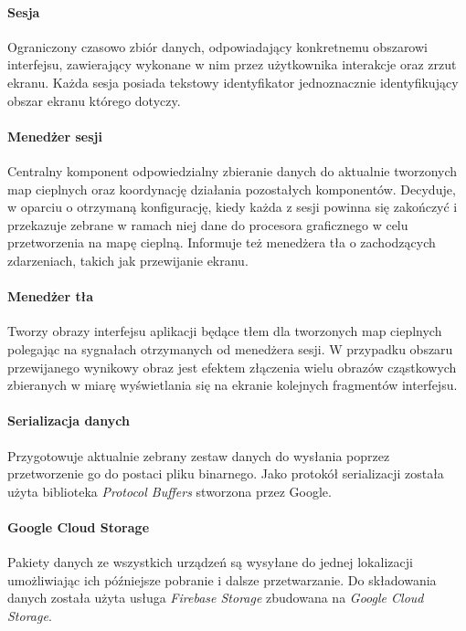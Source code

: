 \paragraph{Sesja}
\label{par:rs_session}
Ograniczony czasowo zbiór danych, odpowiadający konkretnemu obszarowi interfejsu, zawierający wykonane w nim przez użytkownika interakcje oraz zrzut ekranu. Każda sesja posiada tekstowy identyfikator jednoznacznie identyfikujący obszar ekranu którego dotyczy.

\paragraph{Menedżer sesji} 
\label{par:rs_session_manager}
Centralny komponent odpowiedzialny zbieranie danych do aktualnie tworzonych map cieplnych oraz koordynację działania pozostałych komponentów. Decyduje, w oparciu o otrzymaną konfigurację, kiedy każda z sesji powinna się zakończyć i przekazuje zebrane w ramach niej dane do  procesora graficznego w celu przetworzenia na mapę cieplną. Informuje też menedżera tła o zachodzących zdarzeniach, takich jak przewijanie ekranu.

\paragraph{Menedżer tła} 
\label{par:rs_bg_manager}
Tworzy obrazy interfejsu aplikacji będące tłem dla tworzonych map cieplnych polegając na sygnałach otrzymanych od menedżera sesji. W przypadku obszaru przewijanego wynikowy obraz jest efektem złączenia wielu  obrazów cząstkowych zbieranych w miarę wyświetlania się na ekranie kolejnych fragmentów interfejsu.

\paragraph{Serializacja danych}
Przygotowuje aktualnie zebrany zestaw danych do wysłania poprzez przetworzenie go do postaci pliku binarnego. Jako protokół serializacji została użyta biblioteka {\it Protocol Buffers} stworzona przez Google.

\paragraph{Google Cloud Storage}
Pakiety danych ze wszystkich urządzeń są wysyłane do jednej lokalizacji umożliwiając ich późniejsze pobranie i dalsze przetwarzanie. Do składowania danych została użyta usługa {\it Firebase Storage} zbudowana na {\it Google Cloud Storage}.


